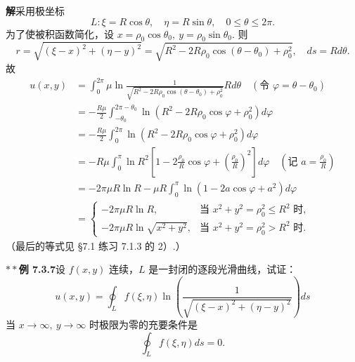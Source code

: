 \documentclass[UTF8,12pt,a4paper,fontset=fandol]{ctexart}
\begin{document}
\noindent\textbf{解}\quad 采用极坐标
\[
L:\xi=R\cos\theta,\quad \eta=R\sin\theta,\quad 0\le\theta\le2\pi.
\]
为了使被积函数简化，设 $x=\rho_0\cos\theta_0,\ y=\rho_0\sin\theta_0$. 则
\[
r=\sqrt{(\xi-x)^2+(\eta-y)^2}
=\sqrt{R^2-2R\rho_0\cos(\theta-\theta_0)+\rho_0^2},\quad ds=Rd\theta.
\]
故
\[
\begin{aligned}
u(x,y)
&=\int_0^{2\pi}\mu\ln
\frac1{\sqrt{R^2-2R\rho_0\cos(\theta-\theta_0)+\rho_0^2}}Rd\theta
\quad(\text{令 }\varphi=\theta-\theta_0)\\
&=-\frac{R\mu}{2}\int_{-\theta_0}^{2\pi-\theta_0}
\ln(R^2-2R\rho_0\cos\varphi+\rho_0^2)d\varphi\\
&=-\frac{R\mu}{2}\int_0^{2\pi}
\ln(R^2-2R\rho_0\cos\varphi+\rho_0^2)d\varphi\\
&=-R\mu\int_0^\pi
\ln R^2\left[1-2\frac{\rho_0}{R}\cos\varphi
+\left(\frac{\rho_0}{R}\right)^2\right]d\varphi
\quad\left(\text{记 }a=\frac{\rho_0}{R}\right)\\
&=-2\pi\mu R\ln R-\mu R\int_0^\pi
\ln(1-2a\cos\varphi+a^2)d\varphi\\
&=
\begin{cases}
-2\pi\mu R\ln R,&\text{当 }x^2+y^2=\rho_0^2\le R^2\text{ 时},\\
-2\pi\mu R\ln\sqrt{x^2+y^2},&\text{当 }x^2+y^2=\rho_0^2>R^2\text{ 时}.
\end{cases}
\end{aligned}
\]
（最后的等式见 §7.1 练习 7.1.3 的 2）.）

\noindent\textbf{$**$例 7.3.7}\quad 设 $f(x,y)$ 连续，$L$ 是一封闭的逐段光滑曲线，试证：
\[
u(x,y)=\oint_Lf(\xi,\eta)\ln\left(\frac1{\sqrt{(\xi-x)^2+(\eta-y)^2}}\right)ds \tag{1}
\]
当 $x\to\infty,\ y\to\infty$ 时极限为零的充要条件是
\[
\oint_Lf(\xi,\eta)ds=0.
\]
\end{document}
